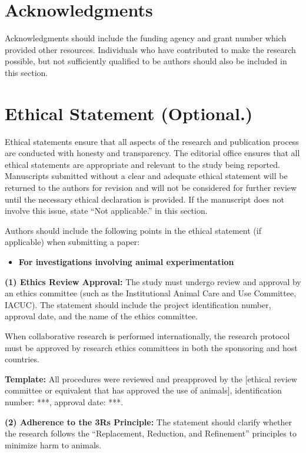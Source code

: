 \documentclass[12pt,a4paper]{article}
\begin{document}
\section{Acknowledgments}

Acknowledgments should include the funding agency and grant number which provided other resources. Individuals who have contributed to make the research possible, but not sufficiently qualified to be authors should also be included in this section.


\section{Ethical Statement (Optional.)}

Ethical statements ensure that all aspects of the research and publication process are conducted with honesty and transparency. The editorial office ensures that all ethical statements are appropriate and relevant to the study being reported. Manuscripts submitted without a clear and adequate ethical statement will be returned to the authors for revision and will not be considered for further review until the necessary ethical declaration is provided. If the manuscript does not involve this issue, state ``Not applicable.'' in this section.

Authors should include the following points in the ethical statement (if applicable) when submitting a paper:

\begin{itemize}
    \item \textbf{For investigations involving animal experimentation}
\end{itemize}

\textbf{(1) Ethics Review Approval:} The study must undergo review and approval by an ethics committee (such as the Institutional Animal Care and Use Committee, IACUC). The statement should include the project identification number, approval date, and the name of the ethics committee.

When collaborative research is performed internationally, the research protocol must be approved by research ethics committees in both the sponsoring and host countries.

\textbf{Template:} All procedures were reviewed and preapproved by the [ethical review committee or equivalent that has approved the use of animals], identification number: ***, approval date: ***.

\textbf{(2) Adherence to the 3Rs Principle:} The statement should clarify whether the research follows the ``Replacement, Reduction, and Refinement'' principles to minimize harm to animals.
\end{document}
